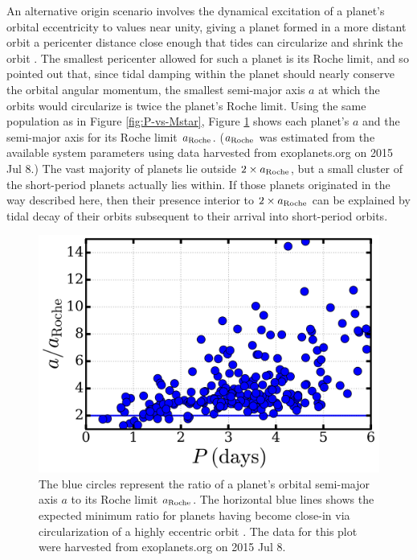 \documentclass{svjour3}                     %
\begin{document}
An alternative origin scenario involves the dynamical excitation of a planet's orbital eccentricity to values near unity, giving a planet formed in a more distant orbit a pericenter distance close enough that tides can circularize and shrink the orbit \cite{2007ApJ...669.1298F,2011ApJ...735..109W}. The smallest pericenter allowed for such a planet is its Roche limit, and so \cite{2006ApJ...638L..45F} pointed out that, since tidal damping within the planet should nearly conserve the orbital angular momentum, the smallest semi-major axis $a$ at which the orbits would circularize is twice the planet's Roche limit. Using the same population as in Figure \ref{fig:P-vs-Mstar}, Figure \ref{fig:a-aRoche} shows each planet's $a$ and the semi-major axis for its Roche limit $a_{\rm Roche}$. ($a_{\rm Roche}$ was estimated from the available system parameters using data harvested from exoplanets.org on 2015 Jul 8.) The vast majority of planets lie outside $2\times a_{\rm Roche}$, but a small cluster of the short-period planets actually lies within. If those planets originated in the way described here, then their presence interior to $2\times a_{\rm Roche}$ can be explained by tidal decay of their orbits subsequent to their arrival into short-period orbits.

\begin{figure}
\includegraphics[width=\textwidth]{a-aRoche}
\caption{The blue circles represent the ratio of a planet's orbital semi-major axis $a$ to its Roche limit $a_{\rm Roche}$. The horizontal blue lines shows the expected minimum ratio for planets having become close-in via circularization of a highly eccentric orbit \cite{2006ApJ...638L..45F}. The data for this plot were harvested from exoplanets.org on 2015 Jul 8.}
\label{fig:a-aRoche}
\end{figure}
\end{document}
